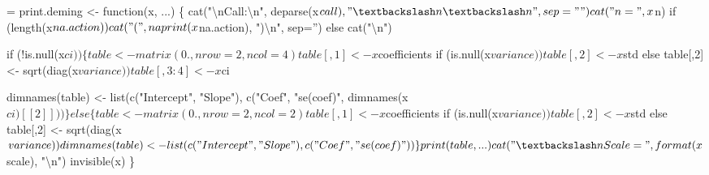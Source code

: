 \documentclass{article}
\begin{document}
\begin{nwchunk}
=
 print.deming <- function(x, ...) \{
     cat("{\textbackslash}nCall:{\textbackslash}n", deparse(x$call), "{\textbackslash}n{\textbackslash}n", sep = "")
     cat("n=", x$n)
     if (length(x$na.action))
         cat("  (", naprint(x$na.action), "){\textbackslash}n", sep='')
     else cat("{\textbackslash}n")
     
     if (!is.null(x$ci)) \{
         table <- matrix(0., nrow=2, ncol=4)
         table[,1] <- x$coefficients
         if (is.null(x$variance))  table[,2] <- x$std 
         else table[,2] <- sqrt(diag(x$variance))
         table[,3:4] <- x$ci
         
         dimnames(table) <- list(c("Intercept", "Slope"),
                                 c("Coef", "se(coef)", dimnames(x$ci)[[2]]))
     \}
     else \{
         table <- matrix(0., nrow=2, ncol=2)
         table[,1] <- x$coefficients
         if (is.null(x$variance))  table[,2] <- x$std 
         else table[,2] <- sqrt(diag(x$variance))
          
         dimnames(table) <- list(c("Intercept", "Slope"),
                                 c("Coef", "se(coef)"))
     \}
     print(table, ...)
     cat("{\textbackslash}n   Scale=", format(x$scale), "{\textbackslash}n")
     invisible(x)
     \}
\end{nwchunk}
\end{document}

